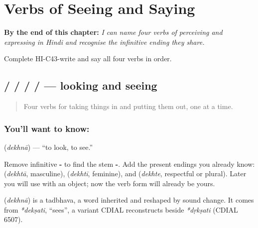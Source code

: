
\chapter{Verbs of Seeing and Saying}
\label{ch:hi-see-say}

\begin{chapteropening}
\textbf{By the end of this chapter:} \emph{I can name four verbs of perceiving and expressing in Hindi and recognise the infinitive ending they share.}

Complete HI-C43-write and say all four verbs in order.
\end{chapteropening}

\section[\texorpdfstring{\hi{देखना} / \hi{देख} / \hi{देखता} … (dekhnā / dekh …)}{देखना / देख / देखता … (dekhnā / dekh …)}]{ /  /  /  /  — looking and seeing}

\label{lesson:HI-C43-look}



\begin{quote}
Four verbs for taking things in and putting them out, one at a time.
\end{quote}

\subsection*{You'll want to know: }
\textbf{} (\emph{dekhnā}) — \textquotedblleft{}to look, to see.\textquotedblright{}

Remove infinitive \textbf{-} to find the stem \textbf{-}. Add the present endings you already know: \textbf{} (\emph{dekhtā}, masculine), \textbf{} (\emph{dekhtī}, feminine), and \textbf{} (\emph{dekhte}, respectful or plural). Later you will use \textbf{ } with an object; now the verb form will already be yours.

\begin{cousinweb}
\textbf{} (\emph{dekhnā}) is a tadbhava, a word inherited and reshaped by sound change. It comes from \emph{*dekṣati}, \textquotedblleft{}sees\textquotedblright{}, a variant CDIAL reconstructs beside \emph{*dṛkṣati} (CDIAL 6507).
\end{cousinweb}

